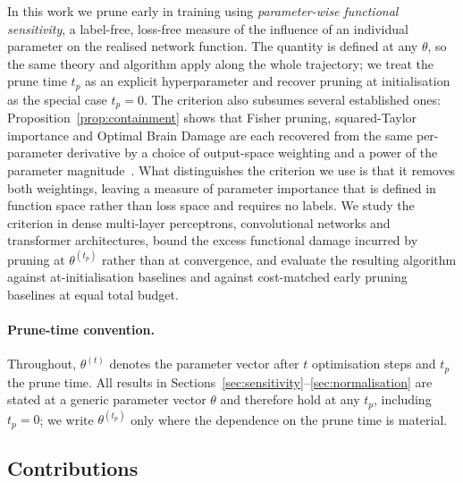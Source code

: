 \documentclass{article}
\theoremstyle{definition}
\theoremstyle{remark}
\begin{document}
In this work we prune early in training using \emph{parameter-wise functional
sensitivity}, a label-free, loss-free measure of the influence of an individual
parameter on the realised network function. The quantity is defined at any
$\theta$, so the same theory and algorithm apply along the whole trajectory; we
treat the prune time $t_p$ as an explicit hyperparameter and recover
pruning at initialisation as the special case $t_p=0$. The criterion also
subsumes several established ones:
Proposition~\ref{prop:containment} shows that Fisher pruning, squared-Taylor
importance and Optimal Brain Damage are each recovered from the same
per-parameter derivative by a choice of output-space weighting and a power of
the parameter magnitude~\cite{lecun1990obd, theis2018fisher,
molchanov2019importance}. What distinguishes the criterion we use is that it
removes both weightings, leaving a measure of parameter importance that is
defined in function space rather than loss space and requires no labels.
We study the criterion in
dense multi-layer perceptrons, convolutional networks and transformer
architectures, bound the excess functional damage incurred by pruning at
$\theta^{(t_p)}$ rather than at convergence, and evaluate the resulting
algorithm against at-initialisation baselines and against cost-matched early
pruning baselines at equal total budget.

\paragraph{Prune-time convention.} Throughout, $\theta^{(t)}$ denotes the
parameter vector after $t$ optimisation steps and $t_p$ the prune time. All
results in Sections~\ref{sec:sensitivity}--\ref{sec:normalisation} are stated
at a generic parameter vector $\theta$ and therefore hold at any $t_p$,
including $t_p=0$; we write $\theta^{(t_p)}$ only where the dependence on the
prune time is material.

\subsection{Contributions}
\end{document}
